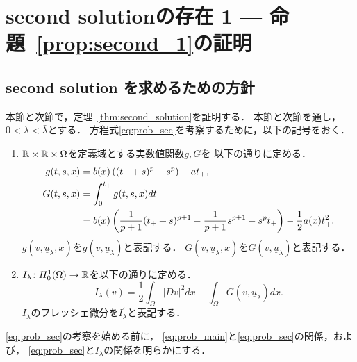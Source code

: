 \section{second solutionの存在 1 --- 命題~\ref{prop:second_1}の証明} \label{sec:second_sol}

\subsection{second solution を求めるための方針}

本節と次節で，定理~\ref{thm:second_solution}を証明する．
本節と次節を通し，$0 < \lambda < \bar{\lambda}$とする．
方程式\ref{eq:prob_sec}を考察するために，以下の記号をおく．

\begin{nota}
 \begin{enumerate}[1.]
  \item $\mathbb{R} \times \mathbb{R} \times \Omega$を定義域とする実数値関数$g, G$を
        以下の通りに定める．
        \begin{align}
         g(t, s, x) &= b(x) \left( (t_+ + s)^p - s^p \right) - a t_+, 
         \label{eq:def_g} \\
         G(t, s, x) &= \int_0^{t_+} g(t, s, x) dt
         \notag \\
         &= b(x) \left( \frac{1}{p+1} (t_+ + s)^{p+1} - \frac{1}{p+1}
         s^{p+1} - s^p t_+ \right) - \frac{1}{2} a(x) t_+^2.
         \label{eq:def_G}
        \end{align}
        $g(v, \underline{u}_\lambda, x)$を$g(v, \underline{u}_\lambda
        )$と表記する．
        $G(v,\underline{u}_\lambda, x)$を$G(v, \underline{u}_\lambda
        )$と表記する．
  \item $I_{\lambda} \colon H_0^1(\Omega) \to \mathbb{R}$を以下の通りに定める．
        \begin{equation}
         I_\lambda (v) = \frac{1}{2} \int_\Omega \lvert Dv \rvert^2 dx
          - \int_\Omega G(v, \underline{u}_\lambda) dx. \label{eq:def_I}
        \end{equation}
        $I_\lambda$のフレッシェ微分を$I_\lambda^\prime$と表記する．
 \end{enumerate}
\end{nota}

\ref{eq:prob_sec}の考察を始める前に，
\ref{eq:prob_main}と\ref{eq:prob_sec}の関係，および，
\ref{eq:prob_sec}と$I_\lambda$の関係を明らかにする．


